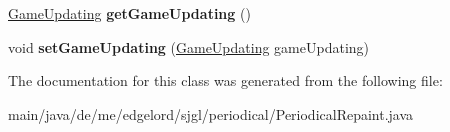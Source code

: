 \begin{DoxyCompactItemize}
\mbox{\hyperlink{classde_1_1me_1_1edgelord_1_1sjgl_1_1periodical_1_1_game_updating}{Game\+Updating}} {\bfseries get\+Game\+Updating} ()
\item 
\mbox{\label{classde_1_1me_1_1edgelord_1_1sjgl_1_1periodical_1_1_periodical_repaint_aba86a575afcd9cb8b261a361cee63b74}} 
void {\bfseries set\+Game\+Updating} (\mbox{\hyperlink{classde_1_1me_1_1edgelord_1_1sjgl_1_1periodical_1_1_game_updating}{Game\+Updating}} game\+Updating)
\end{DoxyCompactItemize}


The documentation for this class was generated from the following file\+:\begin{DoxyCompactItemize}
\item 
main/java/de/me/edgelord/sjgl/periodical/Periodical\+Repaint.\+java\end{DoxyCompactItemize}
